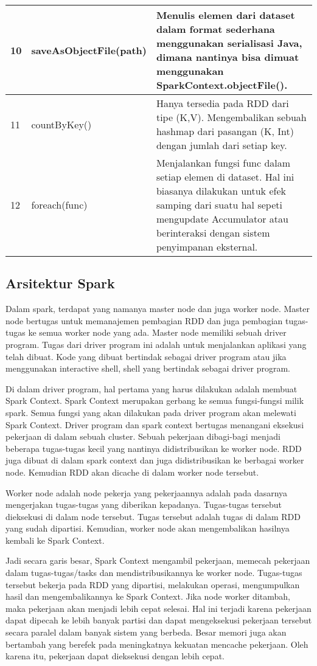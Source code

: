 \begin{tabular}{|p{}|p{}|p{}|}
\hline 
10 & saveAsObjectFile(path) & Menulis elemen dari dataset dalam format sederhana menggunakan serialisasi Java, dimana nantinya bisa dimuat menggunakan SparkContext.objectFile().\\ 
\hline 
11 & countByKey() & Hanya tersedia pada RDD dari tipe (K,V). Mengembalikan sebuah hashmap dari pasangan (K, Int) dengan jumlah dari setiap key.\\ 
\hline 
12 & foreach(func) & Menjalankan fungsi func dalam setiap elemen di dataset. Hal ini biasanya dilakukan untuk efek samping dari suatu hal sepeti mengupdate Accumulator atau berinteraksi dengan sistem penyimpanan eksternal.\\ 
\hline 
\end{tabular} 

\subsection{Arsitektur Spark}
Dalam spark, terdapat yang namanya master node dan juga worker node. Master node bertugas untuk memanajemen pembagian RDD dan juga pembagian tugas-tugas ke semua worker node yang ada. Master node memiliki sebuah driver program. Tugas dari driver program ini adalah untuk menjalankan aplikasi yang telah dibuat. Kode yang dibuat bertindak sebagai driver program atau jika menggunakan interactive shell, shell yang bertindak sebagai driver program.

Di dalam driver program, hal pertama yang harus dilakukan adalah membuat Spark Context. Spark Context merupakan gerbang ke semua fungsi-fungsi milik spark. Semua fungsi yang akan dilakukan pada driver program akan melewati Spark Context. Driver program dan spark context bertugas menangani eksekusi pekerjaan di dalam sebuah cluster. Sebuah pekerjaan dibagi-bagi menjadi beberapa tugas-tugas kecil yang nantinya didistribusikan ke worker node. RDD juga dibuat di dalam spark context dan juga didistribusikan ke berbagai worker node. Kemudian RDD akan dicache di dalam worker node tersebut.

Worker node adalah node pekerja yang pekerjaannya adalah pada dasarnya mengerjakan tugas-tugas yang diberikan kepadanya. Tugas-tugas tersebut dieksekusi di dalam node tersebut. Tugas tersebut adalah tugas di dalam RDD yang sudah dipartisi. Kemudian, worker node  akan mengembalikan hasilnya kembali ke Spark Context.

Jadi secara garis besar, Spark Context mengambil pekerjaan, memecah pekerjaan dalam tugas-tugas/tasks dan mendistribusikannya ke worker node. Tugas-tugas tersebut bekerja pada RDD yang dipartisi, melakukan operasi, mengumpulkan hasil dan mengembalikannya ke Spark Context. 
Jika node worker ditambah, maka pekerjaan akan menjadi lebih cepat selesai. Hal ini terjadi karena pekerjaan dapat dipecah ke lebih banyak partisi dan dapat mengeksekusi pekerjaan tersebut secara paralel dalam banyak sistem yang berbeda. Besar memori juga akan bertambah yang berefek pada meningkatnya kekuatan mencache pekerjaan. Oleh karena itu, pekerjaan dapat dieksekusi dengan lebih cepat.

